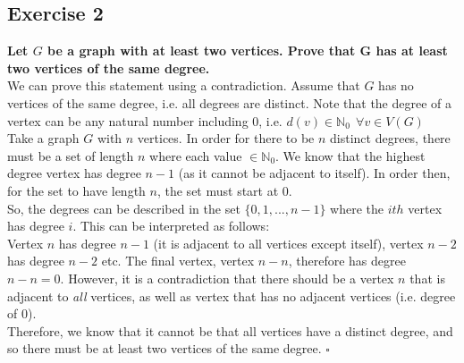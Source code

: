 \subsection*{Exercise 2 }
\boldmath
\textbf{Let $G$ be a graph with at least two vertices. Prove that G has at least two vertices of the same degree.} \\
\linebreak 
\unboldmath
We can prove this statement using a contradiction. Assume that $G$ has no vertices of the same degree, i.e. all degrees are distinct. Note that the degree of a vertex can be any natural number including 0, i.e. $d(v) \in \mathbb{N}_0 \:\: \forall v \in V(G)$\\
\linebreak 
Take a graph $G$ with $n$ vertices. In order for there to be $n$ distinct degrees, there must be a set of length $n$ where each value $\in \mathbb{N}_0$. We know that the highest degree vertex has degree $n-1$ (as it cannot be adjacent to itself). In order then, for the set to have length $n$, the set must start at 0.  \\
\linebreak 
So, the degrees can be described in the set $\{0, 1, ..., n-1\}$ where the $ith$ vertex has degree $i$. This can be interpreted as follows: \\
\linebreak 
Vertex $n$ has degree $n-1$ (it is adjacent to all vertices except itself), vertex $n-2$ has degree $n-2$ etc. %
The final vertex, vertex $n-n$, therefore has degree $n-n = 0$. However, it is a contradiction that there should be a vertex $n$ that is adjacent to \textit{all} vertices, as well as vertex that has no adjacent vertices (i.e. degree of 0). \\
\linebreak 
Therefore, we know that it cannot be that all vertices have a distinct degree, and so there must be at least two vertices of the same degree. \hspace*{10mm} $\square$\\

